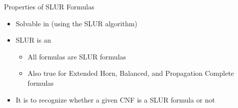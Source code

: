 \documentclass[t]{sdqbeamer}
\begin{document}
\begin{frame}{Properties of SLUR Formulas}
	\begin{itemize}\setlength{\itemsep}{1em}
		\item Solvable in  (using the SLUR algorithm)
		\item SLUR is an 
		\begin{itemize}
			\item All  formulas are SLUR formulas
			\item Also true for Extended Horn, Balanced, and Propagation Complete formulas
		\end{itemize}
		\item It is  to recognize whether a given CNF is a SLUR formula or not
	\end{itemize}
\end{frame}

\end{document}
